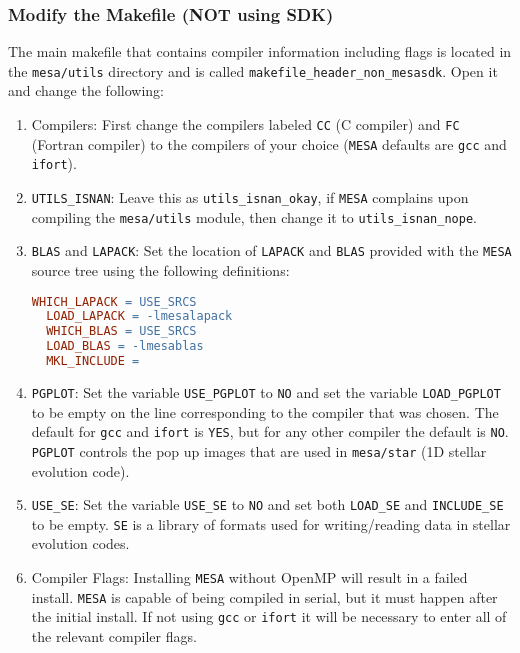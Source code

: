 \subsubsection{Modify the Makefile (NOT using SDK)}
The main makefile that contains compiler information including flags is 
located in the {\tt mesa/utils} directory and is called 
{\tt makefile\_header\_non\_mesasdk}. Open it and change the following:
\begin{enumerate}
\item Compilers: First change the compilers labeled {\tt CC} (C compiler) 
and {\tt FC} (Fortran compiler) to the compilers of your choice ({\tt MESA} 
defaults are {\tt gcc} and {\tt ifort}).

\item {\tt UTILS\_ISNAN}: Leave this as {\tt utils\_isnan\_okay}, if {\tt MESA} 
complains upon compiling the {\tt mesa/utils} module, then change it to 
{\tt utils\_isnan\_nope}.

\item {\tt BLAS} and {\tt LAPACK}: Set the location of {\tt LAPACK} and 
{\tt BLAS} provided with the {\tt MESA} source tree using the following 
definitions:
\begin{lstlisting}[language=make,mathescape=false,upquote=true]
  WHICH_LAPACK = USE_SRCS
  LOAD_LAPACK = -lmesalapack
  WHICH_BLAS = USE_SRCS
  LOAD_BLAS = -lmesablas
  MKL_INCLUDE =
\end{lstlisting}

\item {\tt PGPLOT}: Set the variable {\tt USE\_PGPLOT} to {\tt NO} and set 
the variable {\tt LOAD\_PGPLOT} to be empty on the line corresponding to 
the compiler that was chosen. The default for {\tt gcc} and {\tt ifort} is 
{\tt YES}, but for any other compiler the default is {\tt NO}. {\tt PGPLOT} 
controls the pop up images that are used in {\tt mesa/star} (1D stellar 
evolution code). 

\item {\tt USE\_SE}: Set the variable {\tt USE\_SE} to {\tt NO} and set both 
{\tt LOAD\_SE} and {\tt INCLUDE\_SE} to be empty. {\tt SE} is a library of 
formats used for writing/reading data in stellar evolution codes.

\item Compiler Flags: Installing {\tt MESA} without OpenMP will result in a 
failed install. {\tt MESA} is capable of being compiled in serial, but it 
must happen after the initial install. If not using {\tt gcc} or {\tt ifort} 
it will be necessary to enter all of the relevant compiler flags.
\end{enumerate}

